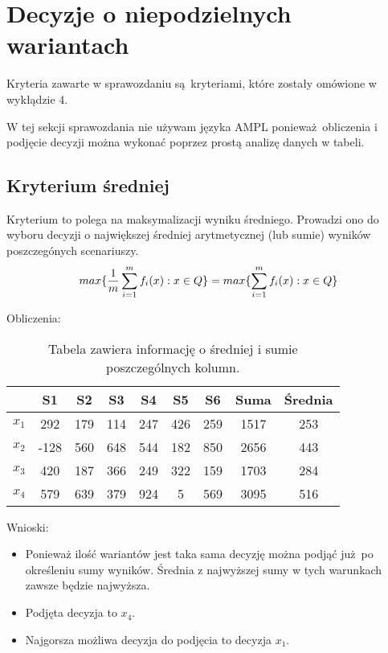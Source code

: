 \documentclass{article}
\begin{document}
\section{Decyzje o niepodzielnych wariantach}

Kryteria zawarte w sprawozdaniu są kryteriami, które zostały omówione w wykłądzie 4.

W tej sekcji sprawozdania nie używam języka AMPL ponieważ obliczenia i podjęcie decyzji można wykonać poprzez
prostą analizę danych w tabeli.

\subsection{Kryterium średniej}

Kryterium to polega na maksymalizacji wyniku średniego. Prowadzi ono do wyboru decyzji o największej średniej arytmetycznej (lub sumie) 
wyników poszczegónych scenariuszy. \\

\begin{equation}
    \centering
    max\{\frac{1}{m} \sum^{m}_{i=1} f_{i}(x) : x \in Q\} = max \{ \sum^{m}_{i=1} f_{i}(x) : x \in Q \}
\end{equation}

Obliczenia:

\begin{table}[H]
  \begin{center}
    \begin{tabular}{ c |  c  c   c   c   c   c  | c | c  }
      & S1 & S2 & S3 & S4 & S5 & S6 & Suma & Średnia \\
      \hline
      $x_1$ & 292 & 179 & 114 & 247 & 426 & 259 & 1517 & 253 \\
      $x_2$ & -128 & 560 & 648 & 544 & 182 & 850 & 2656 & 443 \\
      $x_3$ & 420 & 187 & 366 & 249 & 322 & 159 & 1703 & 284 \\
      $x_4$ & 579 & 639 & 379 & 924 & 5 & 569 & \cellcolor{orange!25} 3095 & \cellcolor{orange!25} 516 \\
      \hline
    \end{tabular} 
    \caption{\label{table:avg}Tabela zawiera informację o średniej i sumie poszczególnych kolumn.}
  \end{center}
\end{table}

Wnioski:

\begin{itemize}
    \item Ponieważ ilość wariantów jest taka sama decyzję można podjąć już po określeniu sumy wyników. Średnia z najwyższej sumy
      w tych warunkach zawsze będzie najwyższa.
    \item Podjęta decyzja to $x_4$.
    \item Najgorsza możliwa decyzja do podjęcia to decyzja $x_1$.
\end{itemize}
\end{document}
